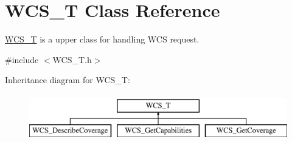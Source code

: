 \hypertarget{classWCS__T}{
\section{WCS\_\-T Class Reference}
\label{classWCS__T}
}


\hyperlink{classWCS__T}{WCS\_\-T} is a upper class for handling WCS request.  




{\ttfamily \#include $<$WCS\_\-T.h$>$}

Inheritance diagram for WCS\_\-T:\begin{figure}[H]
\begin{center}
\leavevmode
\includegraphics[height=2.000000cm]{classWCS__T}
\end{center}
\end{figure}
